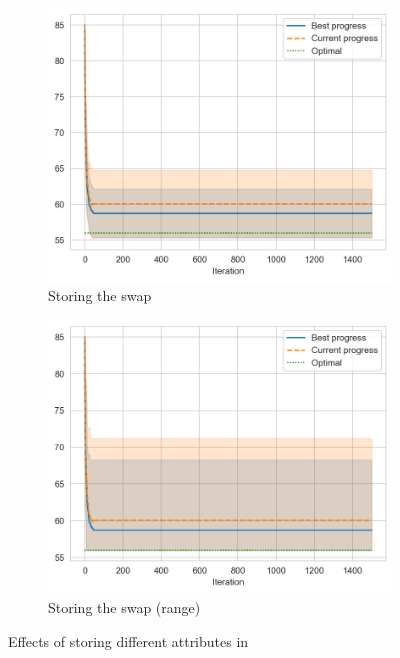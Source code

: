 \begin{figure}[ht]
    \hfill
    \begin{subfigure}{0.45\textwidth}
        \includegraphics[width=\textwidth]{../images/p3/store-swap.png}
        \caption{Storing the swap}
    \end{subfigure}
    \hfill
    \begin{subfigure}{0.45\textwidth}
        \includegraphics[width=\textwidth]{../images/p3/store-swap2.png}
        \caption{Storing the swap (range)}
    \end{subfigure}
    \hfill
    \caption{Effects of storing different attributes in }
    \label{fig:p3-attrs}
\end{figure}

